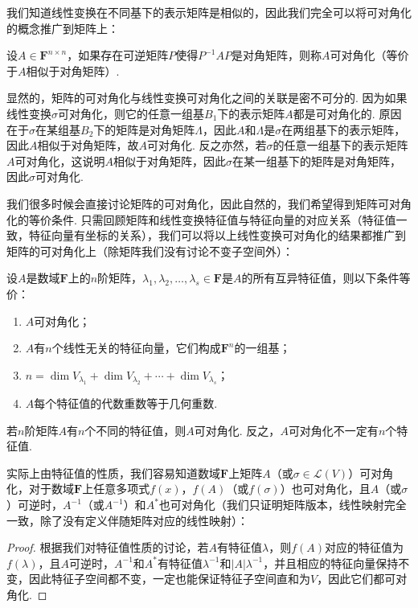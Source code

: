 我们知道线性变换在不同基下的表示矩阵是相似的，因此我们完全可以将可对角化的概念推广到矩阵上：
\begin{definition}
    设$A\in\mathbf{F}^{n\times n}$，如果存在可逆矩阵$P$使得$P^{-1}AP$是对角矩阵，则称$A$可对角化（等价于$A$相似于对角矩阵）.
\end{definition}
显然的，矩阵的可对角化与线性变换可对角化之间的关联是密不可分的. 因为如果线性变换$\sigma$可对角化，则它的任意一组基$B_1$下的表示矩阵$A$都是可对角化的. 原因在于$\sigma$在某组基$B_2$下的矩阵是对角矩阵$\varLambda$，因此$A$和$\varLambda$是$\sigma$在两组基下的表示矩阵，因此$A$相似于对角矩阵，故$A$可对角化. 反之亦然，若$\sigma$的任意一组基下的表示矩阵$A$可对角化，这说明$A$相似于对角矩阵，因此$\sigma$在某一组基下的矩阵是对角矩阵，因此$\sigma$可对角化.

我们很多时候会直接讨论矩阵的可对角化，因此自然的，我们希望得到矩阵可对角化的等价条件. 只需回顾矩阵和线性变换特征值与特征向量的对应关系（特征值一致，特征向量有坐标的关系），我们可以将以上线性变换可对角化的结果都推广到矩阵的可对角化上（除矩阵我们没有讨论不变子空间外）：
\begin{theorem}
    设$A$是数域$\mathbf{F}$上的$n$阶矩阵，$\lambda_1,\lambda_2,\ldots,\lambda_s\in\mathbf{F}$是$A$的所有互异特征值，则以下条件等价：
    \begin{enumerate}
        \item $A$可对角化；
        \item $A$有$n$个线性无关的特征向量，它们构成$\mathbf{F}^n$的一组基；
        \item $n=\dim V_{\lambda_1}+\dim V_{\lambda_2}+\cdots+\dim V_{\lambda_s}$；
        \item $A$每个特征值的代数重数等于几何重数.
    \end{enumerate}
\end{theorem}

\begin{corollary}
    若$n$阶矩阵$A$有$n$个不同的特征值，则$A$可对角化. 反之，$A$可对角化不一定有$n$个特征值.
\end{corollary}

实际上由特征值的性质，我们容易知道数域$\mathbf{F}$上矩阵$A$（或$\sigma\in\mathcal{L}(V)$）可对角化，对于数域$\mathbf{F}$上任意多项式$f(x)$，$f(A)$（或$f(\sigma)$）也可对角化，且$A$（或$\sigma$）可逆时，$A^{-1}$（或$A^{-1}$）和$A^*$也可对角化（我们只证明矩阵版本，线性映射完全一致，除了没有定义伴随矩阵对应的线性映射）：

\begin{proof}
    根据我们对特征值性质的讨论，若$A$有特征值$\lambda$，则$f(A)$对应的特征值为$f(\lambda)$，且$A$可逆时，$A^{-1}$和$A^*$有特征值$\lambda^{-1}$和$|A|\lambda^{-1}$，并且相应的特征向量保持不变，因此特征子空间都不变，一定也能保证特征子空间直和为$V$，因此它们都可对角化.
\end{proof}

